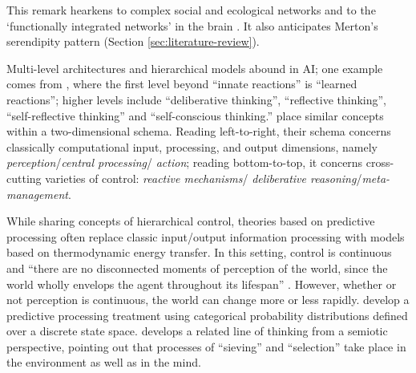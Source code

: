 This remark hearkens to complex social and ecological networks and to
the `functionally integrated networks' in the brain \cite{Pessoa2017}.
It also anticipates Merton's serendipity pattern (Section
\ref{sec:literature-review}).
 



Multi-level architectures and hierarchical models abound in AI; one
example comes from \citet{singh2005architecture}, where the first
level beyond ``innate reactions'' is ``learned reactions''; higher
levels include ``deliberative thinking'', ``reflective thinking'',
``self-reflective thinking'' and ``self-conscious thinking.''
\citet{sloman2002framework} place similar concepts within a
two-dimensional schema.  Reading left-to-right, their schema concerns
classically computational input, processing, and output dimensions,
namely \emph{perception}\slash \emph{central processing}\slash
\emph{action}; reading bottom-to-top, it concerns cross-cutting
varieties of control: \emph{reactive mechanisms}\slash
\emph{deliberative reasoning}\slash \emph{meta-management}.

While sharing concepts of hierarchical control, theories based on
predictive processing often replace classic input/output information
processing with models based on thermodynamic energy transfer.  In
this setting, control is continuous and ``there are no disconnected
moments of perception of the world, since the world wholly envelops
the agent throughout its lifespan''
\cite[pp.~9--10]{10.3389/frobt.2018.00021}.  However, whether or not
perception is continuous, the world can change more or less rapidly.
\citet{KWISTHOUT201784} develop a predictive processing treatment
using categorical probability distributions defined over a discrete
state space.  \citet{kockelman2011biosemiosis} develops a related line
of thinking from a semiotic perspective, pointing out that processes
of ``sieving'' and ``selection'' take place in the environment as well
as in the mind.


